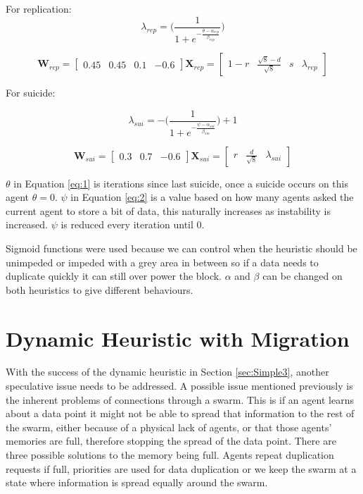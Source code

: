 \documentclass{UoYCSproject}
\begin{document}
For replication:
\begin{equation}
\label{eq:1}
\lambda_{rep} = \big( \frac{1}{1+ e^{- \frac{ \theta - \alpha_{rep} }{ \beta_{rep} } } } \big)
\end{equation}

\begin{equation}
\label{eq:100}
\textbf{W}_{rep} = \begin{bmatrix}0.45 & 0.45 & 0.1 & -0.6 \end{bmatrix}
\textbf{X}_{rep} = \begin{bmatrix} 1-r & \frac{\sqrt{8}-d}{\sqrt{8}} & s & \lambda_{rep} \end{bmatrix}
\end{equation}

For suicide:

\begin{equation}
\label{eq:2}
\lambda_{sui} = - \big( \frac{1}{1+ e^{- \frac{\psi - \alpha_{sui} }{ \beta_{sui} } } } \big) + 1
\end{equation}

\begin{equation}
\label{eq:101}
\textbf{W}_{sui} = \begin{bmatrix}0.3 & 0.7 & -0.6 \end{bmatrix}
\textbf{X}_{sui} = \begin{bmatrix} r & \frac{d}{\sqrt{8}} & \lambda_{sui} \end{bmatrix}
\end{equation}

$\theta$ in Equation \ref{eq:1} is iterations since last suicide, once a suicide occurs on this agent $\theta=0$.
$\psi$ in Equation \ref{eq:2} is a value based on how many agents asked the current agent to store a bit of data, this naturally increases as instability is increased.
$\psi$ is reduced every iteration until 0.

Sigmoid functions were used because we can control when the heuristic should be unimpeded or impeded with a grey area in between so if a data needs to duplicate quickly it can still over power the block.
$\alpha$ and $\beta$ can be changed on both heuristics to give different behaviours.


\section{Dynamic Heuristic with Migration}
\label{sec:Simple4}

With the success of the dynamic heuristic in Section \ref{sec:Simple3}, another speculative issue needs to be addressed. 
A possible issue mentioned previously is the inherent problems of connections through a swarm. 
This is if an agent learns about a data point it might not be able to spread that information to the rest of the swarm, either because of a physical lack of agents, or that those agents' memories are full, therefore stopping the spread of the data point. 
There are three possible solutions to the memory being full. 
Agents repeat duplication requests if full, priorities are used for data duplication or we keep the swarm at a state where information is spread equally around the swarm.
\end{document}
